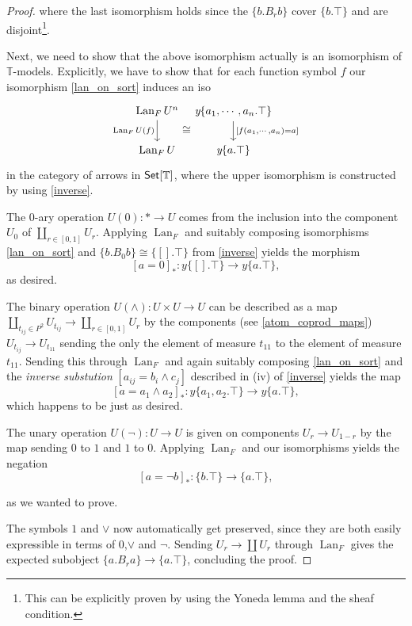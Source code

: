 \documentclass[a4paper]{amsproc}
\theoremstyle{plain}
\theoremstyle{definition}
\theoremstyle{remark}
\numberwithin{equation}{section}
\newcommand{\y}{\textit{y}}
\DeclareMathOperator{\Lan}{Lan}
\newcommand{\Set}{\textup{\textsf{Set}}}
\begin{document}
\begin{proof}
where the last isomorphism holds since the $\{b.B_r b\}$ cover $\{b.\top\}$ and are disjoint\footnote{This can be explicitly proven by using the Yoneda lemma and the sheaf condition.}.

Next, we need to show that the above isomorphism actually is an isomorphism of $\mathbb{T}$-models. Explicitly, we have to show that for each function symbol $f$ our isomorphism \ref{lan_on_sort} induces an iso
\[
\begin{tikzcd}[column sep=tiny]
    \Lan_F U^n \arrow[d, "\Lan_F U(f)"'] \arrow[r, "\cong"',phantom, shift right=7] & {\y \{a_1,\cdots,a_n . \top \}} \arrow[d, "{[f(a_1,\cdots,a_n) = a]}"] \\
    \Lan_F U & \y \{a . \top \}
\end{tikzcd}
\]
in the category of arrows in $\Set[\mathbb{T}]$, where the upper isomorphism is constructed by using \ref{inverse}.

The 0-ary operation $U(0): * \to U$ comes from the inclusion into the component $U_0$ of $\coprod_{r\in [0,1]} U_r$. Applying $\Lan_F$ and suitably composing isomorphisms \ref{lan_on_sort} and $\{b.B_0 b\} \cong \{[].\top\}$ from \ref{inverse} yields the morphism $$[a=0]_*: \y \{[].\top\} \to \y\{a.\top\},$$ as desired.

The binary operation $U(\wedge): U \times U \to U$ can be described as a map $\coprod_{t_{ij} \in P^2} U_{t_{ij}} \to \coprod_{r \in [0,1]} U_r$ by the components (see \ref{atom_coprod_maps}) $U_{t_{ij}} \to U_{t_{11}}$ sending the only the element of measure $t_{11}$ to the element of measure $t_{11}$. Sending this through $\Lan_F$ and again suitably composing \ref{lan_on_sort} and the \emph{inverse substution} $[a_{ij} = b_i \wedge c_j]$ described in (iv) of \ref{inverse} yields the map $$[a=a_1 \wedge a_2]_* : \y \{a_1,a_2.\top\} \to \y \{a.\top\},$$
which happens to be just as desired.

The unary operation $U(\neg): U \to U$ is given on components $U_r \to U_{1-r}$ by the map sending $0$ to $1$ and $1$ to $0$. Applying $\Lan_F$ and our isomorphisms yields the negation $$[a=\neg b]_*: \{b.\top\} \to \{a.\top\},$$

as we wanted to prove.

The symbols $1$ and $\vee$ now automatically get preserved, since they are both easily expressible in terms of $0$,$\vee$ and $\neg$. Sending $U_r \to \coprod U_r$ through $\Lan_F$ gives the expected subobject $\{a.B_r a\} \to \{a.\top\}$, concluding the proof.
\end{proof}
\end{document}
